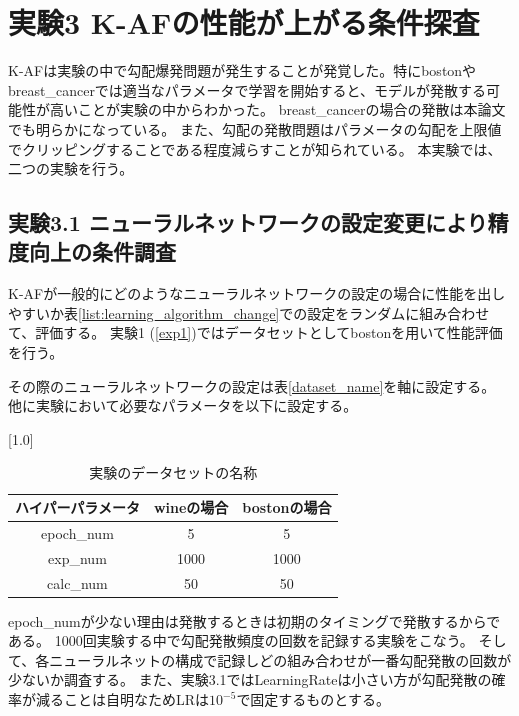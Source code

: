 \section{実験3 K-AFの性能が上がる条件探査}
\label{exp3}
K-AFは実験の中で勾配爆発問題が発生することが発覚した。特にbostonやbreast\_cancerでは適当なパラメータで学習を開始すると、モデルが発散する可能性が高いことが実験の中からわかった。
breast\_cancerの場合の発散は本論文でも明らかになっている。
また、勾配の発散問題はパラメータの勾配を上限値でクリッピングすることである程度減らすことが知られている。
本実験では、二つの実験を行う。

\subsection{実験3.1 ニューラルネットワークの設定変更により精度向上の条件調査}
\label{exp3.1}
K-AFが一般的にどのようなニューラルネットワークの設定の場合に性能を出しやすいか表\ref{list:learning_algorithm_change}での設定をランダムに組み合わせて、評価する。
実験1 (\ref{exp1})ではデータセットとしてbostonを用いて性能評価を行う。


その際のニューラルネットワークの設定は表\ref{dataset_name}を軸に設定する。
他に実験において必要なパラメータを以下に設定する。


\begin{table}[hbtp]
    \begin{center}
        \caption{実験のデータセットの名称}
        \vspace{2mm} 
        \scalebox{1.0}[1.0]{
            \begin{tabular}{||c|c|c||}
            ハイパーパラメータ  & wineの場合 & bostonの場合 \\
            \hline
            epoch\_num                            & 5       & 5  \\
            exp\_num                           & 1000     & 1000 \\
            calc\_num        & 50           & 50  \\
            \end{tabular}
        }
    \end{center}
\end{table}

epoch\_numが少ない理由は発散するときは初期のタイミングで発散するからである。
1000回実験する中で勾配発散頻度の回数を記録する実験をこなう。
そして、各ニューラルネットの構成で記録しどの組み合わせが一番勾配発散の回数が少ないか調査する。
また、実験3.1ではLearningRateは小さい方が勾配発散の確率が減ることは自明なためLRは$ 10^{-5} $で固定するものとする。




